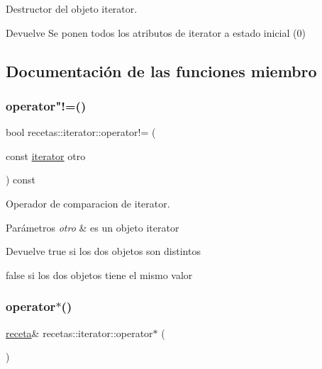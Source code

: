 Destructor del objeto iterator. 

\begin{DoxyReturn}{Devuelve}
Se ponen todos los atributos de iterator a estado inicial (0) 
\end{DoxyReturn}


\subsection{Documentación de las funciones miembro}
\mbox{\label{classrecetas_1_1iterator_aaf5c81706c5c44f0d6b4e9e274192c95}} 
\subsubsection{\texorpdfstring{operator"!=()}{operator!=()}}
{\footnotesize\ttfamily bool recetas\+::iterator\+::operator!= (\begin{DoxyParamCaption}\item[{const \hyperlink{classrecetas_1_1iterator}{iterator}}]{otro }\end{DoxyParamCaption}) const}



Operador de comparacion de iterator. 


\begin{DoxyParams}{Parámetros}
{\em otro} & es un objeto iterator \\
\hline
\end{DoxyParams}
\begin{DoxyReturn}{Devuelve}
true si los dos objetos son distintos 

false si los dos objetos tiene el mismo valor 
\end{DoxyReturn}
\mbox{\label{classrecetas_1_1iterator_a106a2ead5d5049e84764e6d45dba377a}} 
\subsubsection{\texorpdfstring{operator$\ast$()}{operator*()}}
{\footnotesize\ttfamily \hyperlink{classreceta}{receta}\& recetas\+::iterator\+::operator$\ast$ (\begin{DoxyParamCaption}{ }\end{DoxyParamCaption})}



